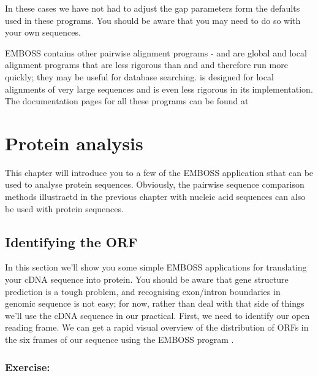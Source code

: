 \documentclass[12pt]{report}
\begin{document}
In these cases we have not had to adjust the gap parameters form the
defaults used in these programs. You should be aware that you may need
to do so with your own sequences.

 EMBOSS contains other pairwise alignment programs - 
 and  are global and local alignment programs that are
 less rigorous than  and  and therefore run
 more quickly; they may be useful for database
 searching.  is designed for local alignments of
 very large sequences and is even less rigorous in its
 implementation. The documentation pages for all these programs can be
 found at\\
 
\chapter{Protein analysis}

This chapter will introduce you to a few of the EMBOSS application
sthat can be used to analyse protein sequences. Obviously, the
pairwise sequence comparison methods illustraetd in the previous
chapter with nucleic acid sequences can also be used with protein
sequences.

\section{Identifying the ORF}
In this section we'll show you some simple EMBOSS applications for
translating your cDNA sequence into protein. You should be aware that
gene structure prediction is a tough problem, and recognising exon/intron
boundaries in genomic sequence is not easy; for now, rather than deal
with that side of things we'll use the cDNA sequence in our
practical. First, we need to identify our open reading frame. We can
get a rapid visual overview of the distribution of ORFs in the six
frames of our sequence using the EMBOSS program .

\subsection*{Exercise: }

\unix{}\\
\\
\\
\end{document}
